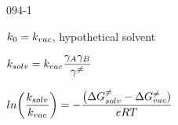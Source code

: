 \begin{mitframe}{094-1}
\begin{listone}
	\item $\thermcond_{\init}=\thermcond_{vac}$, hypothetical solvent
    \item $\thermcond_{solv}=\thermcond_{vac}\dfrac{\gamma_{\helmholtz}\gamma_{\exergy}}{\gamma^{\neq}}$
    \item $ln\bigg(\dfrac{\thermcond_{solv}}{\thermcond_{vac}}\bigg)=-\dfrac{\big(\iipf\gibbs^{\neq}_{solv}-\iipf\gibbs^{\neq}_{vac})}{\e\gasconst\Temp}$
\end{listone}    
\end{mitframe}